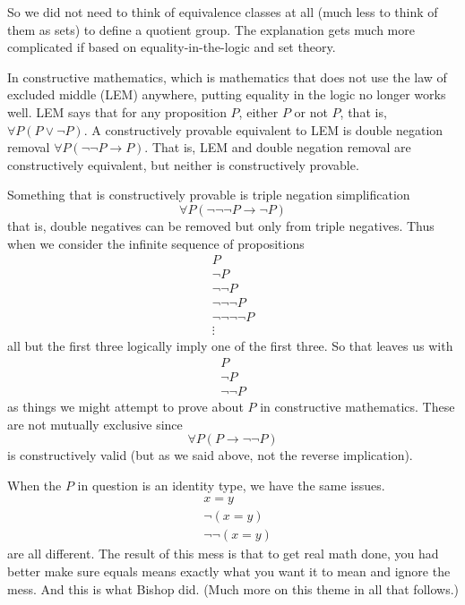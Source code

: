 \documentclass[11pt]{article}
\begin{document}
So we did not need to think of equivalence classes at all (much less to
think of them as sets) to define a quotient group.  The explanation gets
much more complicated if based on equality-in-the-logic and set theory.

In constructive mathematics, which is mathematics that does
not use the law of excluded middle (LEM) anywhere, putting equality
in the logic no longer works well.  LEM says that for any proposition $P$,
either $P$ or not $P$, that is, $\forall P (P \vee \neg P)$.
A constructively provable equivalent to LEM is double negation
removal $\forall P (\neg \neg P \to P)$.
That is, LEM and double negation removal are constructively equivalent,
but neither is constructively provable.

Something that is constructively provable is triple negation simplification
$$
   \forall P (\neg \neg \neg P \to \neg P)
$$
that is, double negatives can be removed but only from triple negatives.
Thus when we consider the infinite sequence of propositions
\begin{gather*}
   P
   \\
   \neg P
   \\
   \neg \neg P
   \\
   \neg \neg \neg P
   \\
   \neg \neg \neg \neg P
   \\
   \vdots
\end{gather*}
all but the first three logically imply one of the first three.
So that leaves us with
\begin{gather*}
   P
   \\
   \neg P
   \\
   \neg \neg P
\end{gather*}
as things we might attempt to prove about $P$ in constructive mathematics.
These are not mutually exclusive since
$$
   \forall P (P \to \neg \neg P)
$$
is constructively valid (but as we said above, not the reverse implication).

When the $P$ in question is an identity type, we have the same issues.
\begin{align*}
   & x = y
   \\
   & \neg (x = y)
   \\
   & \neg \neg (x = y)
\end{align*}
are all different.
The result of this mess is that to get real math done, you had better
make sure equals means exactly what you want it to mean and ignore the
mess.  And this is what Bishop did.  (Much more on this theme in all
that follows.)
\end{document}
